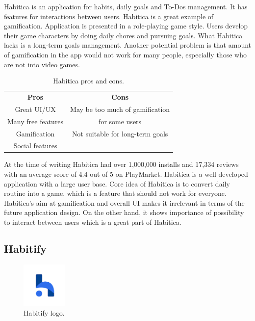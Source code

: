 Habitica is an application for habits, daily goals and To-Dos management.
It has features for interactions between users.
Habitica is a great example of gamification.
Application is presented in a role-playing game style.
Users develop their game characters by doing daily chores and pursuing goals.
What Habitica lacks is a long-term goals management.
Another potential problem is that amount of gamification in the app would not work for many people,
especially those who are not into video games.

\begin{table}[h!]
    \centering
    \begin{ctucolortab}
        \begin{tabular}{cc}
            \bfseries Pros & \bfseries Cons\\\Midrule
            Great UI/UX & May be too much of gamification \\
            Many free features & for some users \\
            Gamification & Not suitable for long-term goals \\
            Social features & \\
        \end{tabular}
    \end{ctucolortab}
    \caption{Habitica pros and cons.}\label{tab:habitica-pros-cons}
\end{table}

At the time of writing Habitica had over 1,000,000 installs and 17,334 reviews with an average score of 4.4 out of 5 on PlayMarket.
Habitica is a well developed application with a large user base.
Core idea of Habitica is to convert daily routine into a game, which is a feature that should not work for everyone.
Habitica's aim at gamification and overall UI makes it irrelevant in terms of the future application design.
On the other hand, it shows importance of possibility to interact between users which is a great part of Habitica.


\subsection{Habitify}\label{subsec:habitify}

\begin{figure}[h!]
    \includegraphics[width=0.20\textwidth]{images/habitify-logo.png}
    \caption{Habitify logo.\cite{habitify-logo}}
    \label{fig:habitify-logo}
\end{figure}

